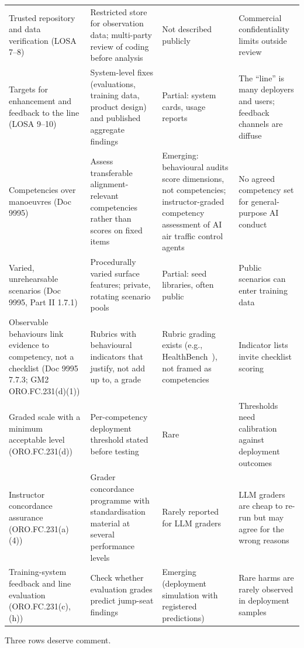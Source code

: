 \documentclass[11pt]{article}
\begin{document}
{\begin{longtable}{@{}>{\raggedright\arraybackslash}p{}>{\raggedright\arraybackslash}p{}>{\raggedright\arraybackslash}p{}>{\raggedright\arraybackslash}p{}@{}}
Trusted repository and data verification (LOSA 7--8) & Restricted store for observation data; multi-party review of coding before analysis & Not described publicly & Commercial confidentiality limits outside review \\
Targets for enhancement and feedback to the line (LOSA 9--10) & System-level fixes (evaluations, training data, product design) and published aggregate findings & Partial: system cards, usage reports & The ``line'' is many deployers and users; feedback channels are diffuse \\
Competencies over manoeuvres (Doc 9995) & Assess transferable alignment-relevant competencies rather than scores on fixed items & Emerging: behavioural audits score dimensions, not competencies; instructor-graded competency assessment of AI air traffic control agents~\cite{carvell2026,pepper2026} & No agreed competency set for general-purpose AI conduct \\
Varied, unrehearsable scenarios (Doc 9995, Part II 1.7.1) & Procedurally varied surface features; private, rotating scenario pools & Partial: seed libraries, often public & Public scenarios can enter training data \\
Observable behaviours link evidence to competency, not a checklist (Doc 9995 7.7.3; GM2 ORO.FC.231(d)(1)) & Rubrics with behavioural indicators that justify, not add up to, a grade & Rubric grading exists (e.g., HealthBench~\cite{arora2025}), not framed as competencies & Indicator lists invite checklist scoring \\
Graded scale with a minimum acceptable level (ORO.FC.231(d)) & Per-competency deployment threshold stated before testing & Rare & Thresholds need calibration against deployment outcomes \\
Instructor concordance assurance (ORO.FC.231(a)(4)) & Grader concordance programme with standardisation material at several performance levels & Rarely reported for LLM graders & LLM graders are cheap to re-run but may agree for the wrong reasons \\
Training-system feedback and line evaluation (ORO.FC.231(c), (h)) & Check whether evaluation grades predict jump-seat findings & Emerging (deployment simulation with registered predictions) & Rare harms are rarely observed in deployment samples \\
\end{longtable}
}

Three rows deserve comment.
\end{document}
